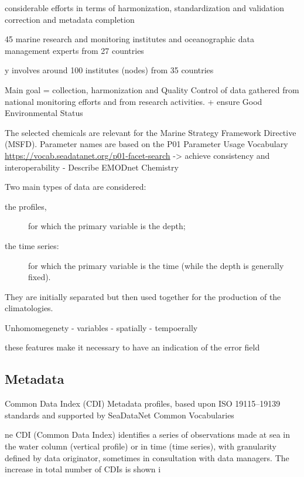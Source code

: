 \documentclass[essd, manuscript]{copernicus}
\begin{document}
considerable efforts in terms of harmonization, standardization
and validation  correction and metadata completion

45 marine research and
monitoring institutes and oceanographic data management experts from 27 countries

y involves around
100 institutes (nodes) from 35 countries 

Main goal = collection, harmonization and Quality Control of data gathered from national monitoring efforts and from research activities.
+ ensure Good Environmental Status \citep{Vinci2017}

 
The selected chemicals are relevant for the Marine Strategy Framework Directive (MSFD). 
Parameter names are based on the P01 Parameter Usage Vocabulary \url{https://vocab.seadatanet.org/p01-facet-search} -> achieve consistency and interoperability
- Describe EMODnet Chemistry \citep{Giorgetti2018}

Two main types of data are considered: 
\begin{description}
\item[the profiles,] for which the primary variable is the depth;
\item[the time series:] for which the primary variable is the time (while the depth is generally fixed).
\end{description}
They are initially separated but then used together for the production of the climatologies. 

Unhomomegenety
- variables
- spatially
- tempoerally

these features make it necessary to have an indication of the error field

%

\subsection{Metadata}

Common Data Index (CDI) Metadata profiles, based upon ISO 19115–19139 standards and supported by SeaDataNet Common Vocabularies

ne CDI (Common Data Index)
identifies a series of observations made at sea in the water column
(vertical profile) or in time (time series), with granularity defined by
data originator, sometimes in consultation with data managers. The
increase in total number of CDIs is shown i
\end{document}
